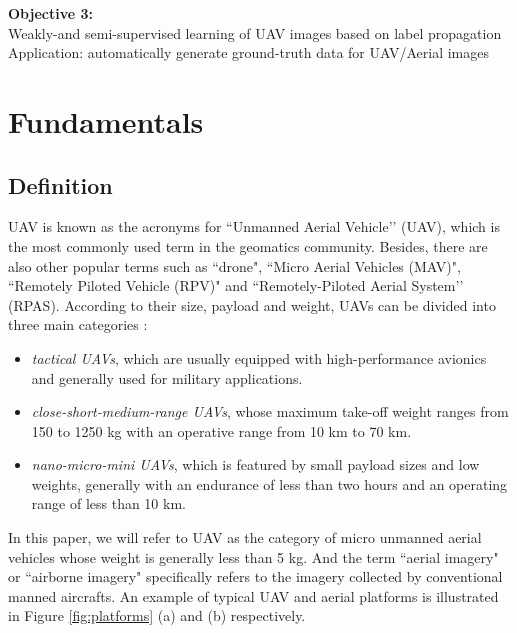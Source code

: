 \documentclass[%
  headings = standardclasses, %
]{tumDiss}
\begin{document}
\textbf{Objective 3:}\\
Weakly-and semi-supervised learning of UAV images based on label propagation\\
Application: automatically generate ground-truth data for UAV/Aerial images

\chapter{Fundamentals}
\label{chap:fund}

\section{Definition}
UAV is known as the acronyms for ``Unmanned Aerial Vehicle’’ (UAV), which is the most commonly used term in the geomatics community. Besides, there are also other popular terms such as ``drone", ``Micro Aerial Vehicles (MAV)", ``Remotely Piloted Vehicle (RPV)" and ``Remotely-Piloted Aerial System’’ (RPAS). According to their size, payload and weight, UAVs can be divided into three main categories \cite{blyenburgh2013yearbook}: 
\begin{itemize}
\item \textit{tactical UAVs}, which are usually equipped with high-performance avionics and generally used for military applications.
\item \textit{close-short-medium-range UAVs}, whose maximum take-off weight ranges from 150 to 1250 kg with an operative range from 10 km to 70 km.  
\item \textit{nano-micro-mini UAVs}, which is featured by small payload sizes and low weights, generally with an endurance of less than two hours and an operating range of less than 10 km.
\end{itemize}


In this paper, we will refer to UAV as the category of micro unmanned aerial vehicles whose weight is generally less than 5 kg. And the term ``aerial imagery" or ``airborne imagery" specifically refers to the imagery collected by conventional manned aircrafts. An example of typical UAV and aerial platforms is illustrated in Figure \ref{fig:platforms} (a) and (b) respectively.
\end{document}
